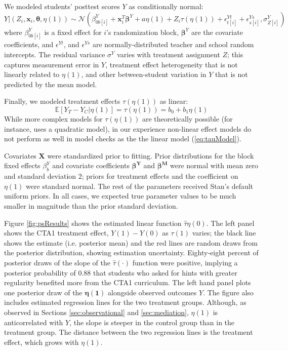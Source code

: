 \documentclass{article}\usepackage[]{graphicx}\usepackage[]{color}
\newcommand{\EE}{\mathbb{E}}
\begin{document}
We modeled students' posttest scores $Y$ as
conditionally normal:
\begin{equation}\label{eq:outcomeSubmodel}
 Y|\left(Z_i,\bm{x}_i,\bm{\theta},\eta(1)\right) \sim  \mathcal{N}\left(
\beta^Y_{0b[i]}+\bm{x}_i^T\bm{\beta}^Y+a\eta(1)+Z_i\tau(\eta(1))+\epsilon^{Yt}_{t[i]}+\epsilon^{Ys}_{s[i]},\sigma^Y_{Z[i]}\right)
\end{equation}
where $\beta^Y_{0b[i]}$ is a fixed effect for $i$'s randomization block, $\bm{\beta}^Y$ are the
covariate coefficients, and $\epsilon^{Yt}$, and
$\epsilon^{Ys}$ are normally-distributed teacher and school random
intercepts.
The residual variance $\sigma^Y$ varies with treatment assignment $Z$;
this captures measurement error in $Y$, treatment effect heterogeneity
that is not linearly related to
$\eta(1)$, and other between-student variation in $Y$ that is not predicted by
the mean model.

Finally, we modeled treatment effects
$\tau(\eta(1))$ as linear:
\begin{equation}\label{eq:tauModel}
\EE[Y_{T}-Y_{C}|\eta(1)]=\tau({\eta(1)})=b_0+b_1\eta(1)
\end{equation}
While more complex models for $\tau(\eta(1))$ are theoretically
possible (for instance, \citet{jin2008principal} uses a quadratic
model), in our experience non-linear effect models do not perform as
well in model checks as the the linear model (\ref{eq:tauModel}).

Covariates $\bm{X}$ were standardized prior to fitting.
Prior distributions for the block fixed effects $\beta^Y_b$ and covariate coefficients
$\bm{\beta^Y}$ and $\bm{\beta^M}$ were normal with mean zero and
standard deviation 2;
priors for treatment effects and the coefficient on $\eta(1)$ were standard
normal.
The rest of the parameters received Stan's default uniform priors.
In all cases, we expected true parameter values to be much smaller in
magnitude than the prior standard deviation.

Figure \ref{fig:psResults} shows the estimated linear function
$\hat{\tau}{\eta(0)}$.
The left panel shows the CTA1 treatment effect, $Y(1)-Y(0)$ as
$\tau(1)$ varies; the black line shows the estimate (i.e. posterior
mean) and the red lines are random draws from the posterior
distribution, showing estimation uncertainty.
Eighty-eight percent of posterior draws of the slope of the
$\hat{\tau}(\cdot)$ function were positive, implying a posterior
probability of 0.88 that students who asked for hints
with greater regularity benefited more from the CTA1 curriculum.
The left hand panel plots one posterior draw of the $\bm{\eta(1)}$
alongside observed outcomes $Y$.
The figure also includes estimated regression lines for the two
treatment groups.
Although, as observed in Sections \ref{sec:observational} and
\ref{sec:mediation}, $\eta(1)$ is anticorrelated with $Y$, the slope
is steeper in the control group than in the treatment group.
The distance between the two regression lines is the treatment effect,
which grows with $\eta(1)$.
\end{document}
